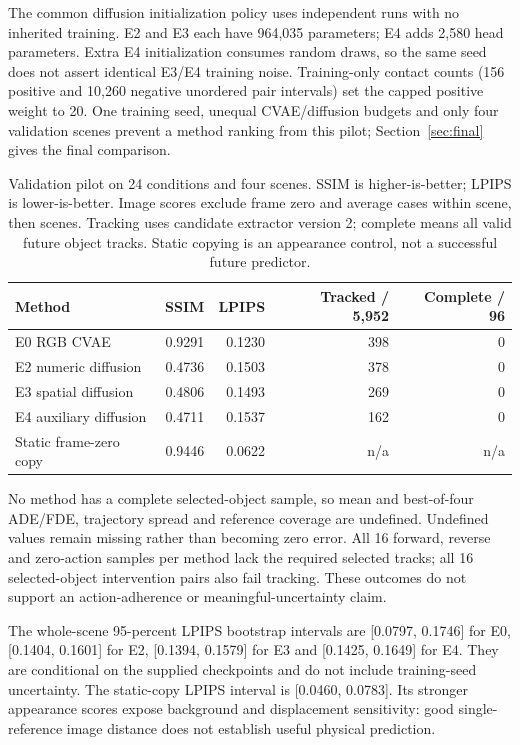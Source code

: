\documentclass[11pt,a4paper]{article}
\begin{document}
The common diffusion initialization policy uses independent runs with no inherited training. E2 and E3 each have 964,035 parameters; E4 adds 2,580 head parameters. Extra E4 initialization consumes random draws, so the same seed does not assert identical E3/E4 training noise. Training-only contact counts (156 positive and 10,260 negative unordered pair intervals) set the capped positive weight to 20. One training seed, unequal CVAE/diffusion budgets and only four validation scenes prevent a method ranking from this pilot; Section~\ref{sec:final} gives the final comparison.

\begin{table}[!ht]
\centering
\small
\begin{tabular}{lrrrr}
\hline
Method & SSIM & LPIPS & Tracked / 5,952 & Complete / 96 \\
\hline
E0 RGB CVAE & 0.9291 & 0.1230 & 398 & 0 \\
E2 numeric diffusion & 0.4736 & 0.1503 & 378 & 0 \\
E3 spatial diffusion & 0.4806 & 0.1493 & 269 & 0 \\
E4 auxiliary diffusion & 0.4711 & 0.1537 & 162 & 0 \\
Static frame-zero copy & 0.9446 & 0.0622 & n/a & n/a \\
\hline
\end{tabular}
\caption{Validation pilot on 24 conditions and four scenes. SSIM is higher-is-better; LPIPS is lower-is-better. Image scores exclude frame zero and average cases within scene, then scenes. Tracking uses candidate extractor version 2; complete means all valid future object tracks. Static copying is an appearance control, not a successful future predictor.}
\label{tab:multiscene}
\end{table}

No method has a complete selected-object sample, so mean and best-of-four ADE/FDE, trajectory spread and reference coverage are undefined. Undefined values remain missing rather than becoming zero error. All 16 forward, reverse and zero-action samples per method lack the required selected tracks; all 16 selected-object intervention pairs also fail tracking. These outcomes do not support an action-adherence or meaningful-uncertainty claim.

The whole-scene 95-percent LPIPS bootstrap intervals are [0.0797, 0.1746] for E0, [0.1404, 0.1601] for E2, [0.1394, 0.1579] for E3 and [0.1425, 0.1649] for E4. They are conditional on the supplied checkpoints and do not include training-seed uncertainty. The static-copy LPIPS interval is [0.0460, 0.0783]. Its stronger appearance scores expose background and displacement sensitivity: good single-reference image distance does not establish useful physical prediction.
\end{document}
